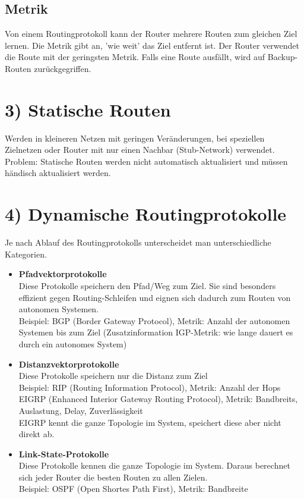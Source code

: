 \subsection*{Metrik}
Von einem Routingprotokoll kann der Router mehrere Routen zum gleichen Ziel lernen. Die Metrik gibt an, 'wie weit' das Ziel entfernt ist. Der Router verwendet die Route mit der geringsten Metrik. Falls eine Route ausfällt, wird auf Backup-Routen zurückgegriffen.

\section*{3) Statische Routen}
Werden in kleineren Netzen mit geringen Veränderungen, bei speziellen Zielnetzen oder Router mit nur einen Nachbar (Stub-Network) verwendet. \\
Problem: Statische Routen werden nicht automatisch aktualisiert und müssen händisch aktualisiert werden.

\section*{4) Dynamische Routingprotokolle}
Je nach Ablauf des Routingprotokolls unterscheidet man unterschiedliche Kategorien.
\begin{itemize}
	\item \textbf{Pfadvektorprotokolle} \\
	Diese Protokolle speichern den Pfad/Weg zum Ziel. Sie sind besonders effizient gegen Routing-Schleifen und eignen sich dadurch zum Routen von autonomen Systemen. \\
	Beispiel: BGP (Border Gateway Protocol), Metrik: Anzahl der autonomen Systemen bis zum Ziel (Zusatzinformation IGP-Metrik: wie lange dauert es durch ein autonomes System)
	\item \textbf{Distanzvektorprotokolle} \\
	Diese Protokolle speichern nur die Distanz zum Ziel \\
	Beispiel: RIP (Routing Information Protocol), Metrik: Anzahl der Hops \\
	EIGRP (Enhanced Interior Gateway Routing Protocol), Metrik: Bandbreits, Auslastung, Delay, Zuverlässigkeit \\
	EIGRP kennt die ganze Topologie im System, speichert diese aber nicht direkt ab.
	\item \textbf{Link-State-Protokolle} \\
	Diese Protokolle kennen die ganze Topologie im System. Daraus berechnet sich jeder Router die besten Routen zu allen Zielen. \\
	Beispiel: OSPF (Open Shortes Path First), Metrik: Bandbreite
\end{itemize}


